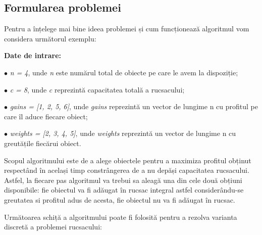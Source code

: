 \subsection*{Formularea problemei}
Pentru a înțelege mai bine ideea problemei și cum funcționează algoritmul vom considera următorul exemplu:
\begin{textbox}
\textbf{Date de intrare:} \par
$\bullet$ \textit{n = 4}, unde \textit{n} este numărul total de obiecte pe care le avem la dispoziție; \par
$\bullet$ \textit{c = 8}, unde \textit{c} reprezintă capacitatea totală a rucsacului; \par
$\bullet$ \textit{gains = [1, 2, 5, 6]}, unde \textit{gains} reprezintă un vector de lungime n cu profitul pe care îl aduce fiecare obiect; \par
$\bullet$ \textit{weights = [2, 3, 4, 5]}, unde \textit{weights} reprezintă un vector de lungime n cu greutățile fiecărui obiect.
\end{textbox}

Scopul algoritmului este de a alege obiectele pentru a maximiza profitul obținut respectând în același timp constrângerea de a nu depăși capacitatea rucsacului. Astfel, la fiecare pas algoritmul va trebui sa aleagă una din cele două obțiuni disponibile: fie obiectul va fi adăugat în rucsac integral astfel considerându-se greutatea si profitul adus de acesta, fie obiectul nu va fi adăugat în rucsac. \par
Următoarea schiță a algoritmului poate fi folosită pentru a rezolva varianta discretă a problemei rucsacului:

